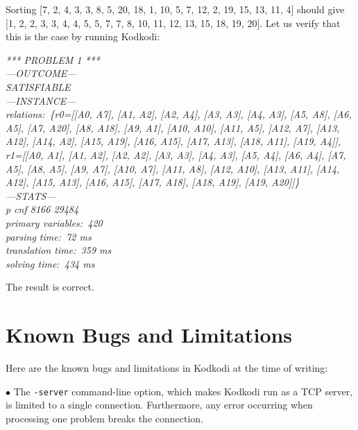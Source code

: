 \documentclass[a4paper,12pt]{article}
\begin{document}
\begin{enum}
        Sorting [7, 2, 4, 3, 3, 8, 5, 20, 18, 1, 10, 5, 7, 12, 2, 19, 15, 13, 11, 4]
        should give [1, 2, 2, 3, 3, 4, 4, 5, 5, 7, 7, 8, 10, 11, 12, 13, 15, 18, 19,
        20]. Let us verify that this is the case by running Kodkodi:

        \pre
        \ttfamily\small\slshape
        *** PROBLEM 1 *** \\[2\smallskipamount]
        ---OUTCOME--- \\
        SATISFIABLE \\[2\smallskipamount]
        ---INSTANCE--- \\
        relations:~\{r0=[[A0, A7], [A1, A2], [A2, A4], [A3, A3], [A4, A3], [A5, A8],
        [A6, A5], [A7, A20], [A8, A18], [A9, A1], [A10, A10], [A11, A5], [A12, A7],
        [A13, A12], [A14, A2], [A15, A19], [A16, A15], [A17, A13], [A18, A11], [A19,
        A4]], r1=[[A0, A1], [A1, A2], [A2, A2], [A3, A3], [A4, A3], [A5, A4], [A6, A4],
        [A7, A5], [A8, A5], [A9, A7], [A10, A7], [A11, A8], [A12, A10], [A13, A11],
        [A14, A12], [A15, A13], [A16, A15], [A17, A18], [A18, A19], [A19, A20]]\}
        \\[2\smallskipamount]
        ---STATS--- \\
        p cnf 8166 29484 \\
        primary variables:~420 \\
        parsing time:~72 ms \\
        translation time:~359 ms \\
        solving time:~434 ms
        \post

        The result is correct.
    \end{enum}


    \section{Known Bugs and Limitations}
    \label{known-bugs-and-limitations}

    Here are the known bugs and limitations in Kodkodi at the time of writing:

    \begin{enum}
        \item[$\bullet$] The \texttt{-server} command-line option, which makes Kodkodi
        run as a TCP server, is limited to a single connection. Furthermore, any error
        occurring when processing one problem breaks the connection.
    \end{enum}

    \let\em=\sl
    {}
    
\end{document}
